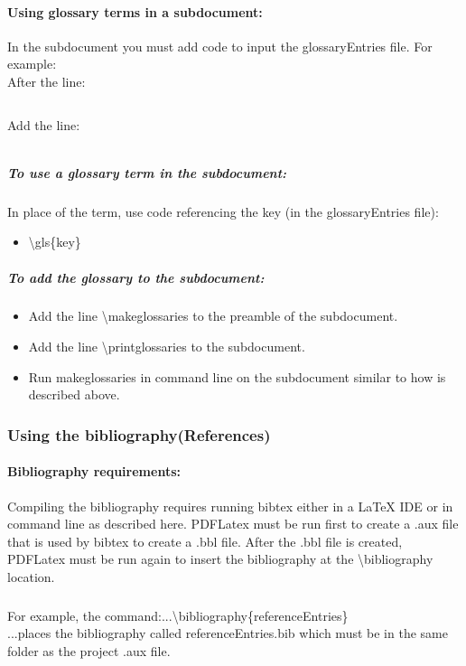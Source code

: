\documentclass[class=book , crop=false]{standalone}
\begin{document}
\paragraph{Using glossary terms in a subdocument:}
In the subdocument you must add code to input the glossaryEntries file.  For example:\\
After the line:
\begin{verbatim}

\end{verbatim}
Add the line:
\begin{verbatim}

\end{verbatim}
\subparagraph{To use a glossary term in the subdocument:\texorpdfstring{\\}{}}
In place of the term, use code referencing the key (in the glossaryEntries file):
\begin{itemize}
\item \textbackslash gls\{key\}
\end{itemize} 
\subparagraph{To add the glossary to the subdocument:}
\begin{itemize}
\item Add the line \textbackslash makeglossaries to the preamble of the subdocument.
\item Add the line \textbackslash printglossaries to the subdocument.
\item Run makeglossaries in command line on the subdocument similar to how is described above.
\end{itemize}




\subsubsection[Using the bibliography(References)]{{\Large Using the bibliography(References)}}
\paragraph{Bibliography requirements:}
Compiling the bibliography requires running bibtex either in a \LaTeX{} IDE or in command line as described here.  PDFLatex must be run first to create a .aux file that is used by bibtex to create a .bbl file.  After the .bbl file is created, PDFLatex must be run again to insert the bibliography at the \textbackslash bibliography location. \subparagraph{}
For example, the command:...\textbackslash bibliography\{referenceEntries\}\\
...places the bibliography called referenceEntries.bib which must be in the same folder as the project .aux file. 
\end{document}
